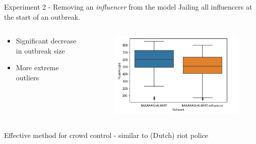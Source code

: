 \documentclass[10pt]{beamer}
\begin{document}
    \begin{frame}{Experiment 2 - Removing an \textit{influencer} from the model}
        Jailing all influencers at the start of an outbreak.
        \begin{columns}
            \begin{column}{0.3\textwidth}
                \begin{itemize}
                    \item Significant decrease in outbreak size
                    \item More extreme outliers
                \end{itemize}
            \end{column}
            \begin{column}{0.7\textwidth}
                \begin{figure}
                    \centering
                    \includegraphics[scale=0.5]{pictures/network_comparison/influencer_removal.jpg}
                \end{figure}

            \end{column}
        \end{columns}
        Effective method for crowd control - similar to (Dutch) riot police
    \end{frame}
\end{document}

